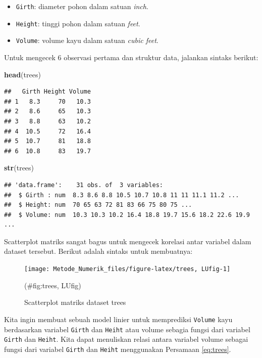 \documentclass[
]{book}
\newenvironment{Shaded}{\begin{snugshade}}{\end{snugshade}}
\newcommand{\FunctionTok}[1]{\textcolor[rgb]{0.13,0.29,0.53}{\textbf{#1}}}
\newcommand{\NormalTok}[1]{#1}
\providecommand{\tightlist}{%
  \setlength{\itemsep}{0pt}\setlength{\parskip}{0pt}}
\theoremstyle{definition}
\theoremstyle{definition}
\theoremstyle{definition}
\theoremstyle{definition}
\theoremstyle{remark}
\begin{document}
\begin{itemize}
\tightlist
\item
  \texttt{Girth}: diameter pohon dalam satuan \emph{inch}.
\item
  \texttt{Height}: tinggi pohon dalam satuan \emph{feet}.
\item
  \texttt{Volume}: volume kayu dalam satuan \emph{cubic feet}.
\end{itemize}

Untuk mengecek 6 observasi pertama dan struktur data, jalankan sintaks berikut:

\begin{Shaded}
\begin{Highlighting}[]
\FunctionTok{head}\NormalTok{(trees)}
\end{Highlighting}
\end{Shaded}

\begin{verbatim}
##   Girth Height Volume
## 1   8.3     70   10.3
## 2   8.6     65   10.3
## 3   8.8     63   10.2
## 4  10.5     72   16.4
## 5  10.7     81   18.8
## 6  10.8     83   19.7
\end{verbatim}

\begin{Shaded}
\begin{Highlighting}[]
\FunctionTok{str}\NormalTok{(trees)}
\end{Highlighting}
\end{Shaded}

\begin{verbatim}
## 'data.frame':    31 obs. of  3 variables:
##  $ Girth : num  8.3 8.6 8.8 10.5 10.7 10.8 11 11 11.1 11.2 ...
##  $ Height: num  70 65 63 72 81 83 66 75 80 75 ...
##  $ Volume: num  10.3 10.3 10.2 16.4 18.8 19.7 15.6 18.2 22.6 19.9 ...
\end{verbatim}

Scatterplot matriks sangat bagus untuk mengecek korelasi antar variabel dalam dataset tersebut. Berikut adalah sintaks untuk membuatnya:

\begin{figure}

{\centering \texttt{[image: Metode\_Numerik\_files/figure-latex/trees, LUfig-1]} 

}

\caption{Scatterplot matriks dataset trees}(\#fig:trees, LUfig)
\end{figure}

Kita ingin membuat sebuah model linier untuk memprediksi \texttt{Volume} kayu berdasarkan variabel \texttt{Girth} dan \texttt{Heiht} atau volume sebagia fungsi dari variabel \texttt{Girth} dan \texttt{Heiht}. Kita dapat menuliskan relasi antara variabel volume sebagai fungsi dari variabel \texttt{Girth} dan \texttt{Heiht} menggunakan Persamaan \eqref{eq:trees}.
\end{document}
